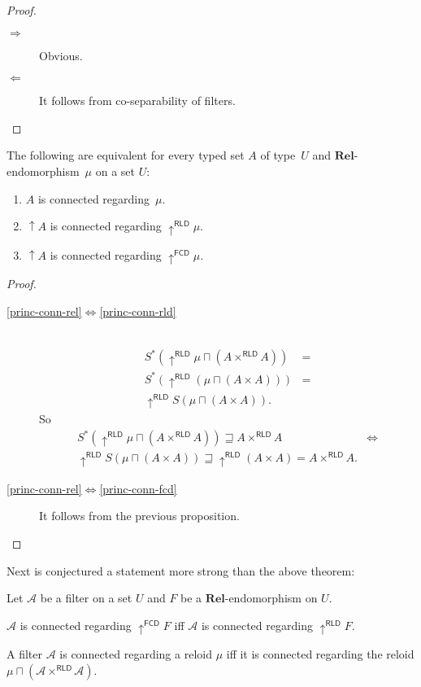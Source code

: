\begin{proof}
~
\begin{description}
\item [{$\Rightarrow$}] Obvious.
\item [{$\Leftarrow$}] It follows from co-separability of filters.
\end{description}
\end{proof}
\begin{thm}
The following are equivalent for every typed set $A$ of type~$U$
and $\mathbf{Rel}$-endomorphism~$\mu$ on a set $U$:
\begin{enumerate}
\item \label{princ-conn-rel}$A$ is connected regarding~$\mu$.
\item \label{princ-conn-rld}$\uparrow A$ is connected regarding $\uparrow^{\mathsf{RLD}}\mu$.
\item \label{princ-conn-fcd}$\uparrow A$ is connected regarding $\uparrow^{\mathsf{FCD}}\mu$.
\end{enumerate}
\end{thm}
\begin{proof}
~
\begin{description}
\item [{\ref{princ-conn-rel}$\Leftrightarrow$\ref{princ-conn-rld}}] ~
\begin{align*}
S^{\ast}(\uparrow^{\mathsf{RLD}}\mu\sqcap(A\times^{\mathsf{RLD}}A)) & =\\
S^{\ast}(\uparrow^{\mathsf{RLD}}(\mu\sqcap(A\times A))) & =\\
\uparrow^{\mathsf{RLD}}S(\mu\sqcap(A\times A)).
\end{align*}
So
\begin{align*}
S^{\ast}(\uparrow^{\mathsf{RLD}}\mu\sqcap(A\times^{\mathsf{RLD}}A))\sqsupseteq A\times^{\mathsf{RLD}}A & \Leftrightarrow\\
\uparrow^{\mathsf{RLD}}S(\mu\sqcap(A\times A))\sqsupseteq\uparrow^{\mathsf{RLD}}(A\times A)=A\times^{\mathsf{RLD}}A.
\end{align*}

\item [{\ref{princ-conn-rel}$\Leftrightarrow$\ref{princ-conn-fcd}}] It
follows from the previous proposition.
\end{description}
\end{proof}
Next is conjectured a statement more strong than the above theorem:
\begin{conjecture}
Let $\mathcal{A}$ be a filter on a set $U$ and $F$ be a $\mathbf{Rel}$-endomorphism
on $U$.

$\mathcal{A}$ is connected regarding $\uparrow^{\mathsf{FCD}}F$
iff $\mathcal{A}$ is connected regarding $\uparrow^{\mathsf{RLD}}F$.\end{conjecture}
\begin{obvious}
A filter $\mathcal{A}$ is connected regarding a reloid $\mu$ iff
it is connected regarding the reloid $\mu\sqcap(\mathcal{A}\times^{\mathsf{RLD}}\mathcal{A})$.
\end{obvious}

